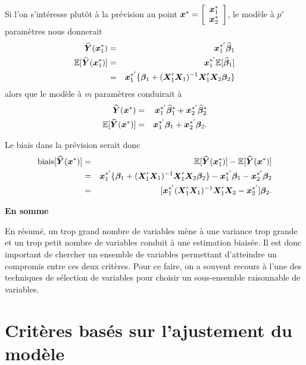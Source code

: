 Si l'on s'intéresse plutôt à la prévision au point ${\bm{x}}^* = \left[\begin{array}{cc}{\bm{x}}_1^*\\{\bm{x}}_2^*\end{array}\right]$, le modèle à $p'$ paramètres nous donnerait
\begin{eqnarray*}
   \widehat{\bm{Y}}({\bm{x}}_1^{*}) &=& {\bm{x}}_{1}^{*'} \widehat{\bm\beta}_1 \\
  \mathbb{E}[\widehat{\bm{Y}}({\bm{x}}_1^{*})] &=& {\bm{x}}_{1}^{*'} \mathbb{E}[\widehat{\bm\beta}_1]  \\
     &=& {\bm{x}}_{1}^{*'} \{\bm\beta_1 + (\bm{X}_1'\bm{X}_1)^{-1}\bm{X}_1'\bm{X}_2 \bm\beta_2\}
\end{eqnarray*}
alors que le modèle à $m$ paramètres conduirait à
\begin{eqnarray*}
   \widehat{\bm{Y}}({\bm{x}}^{*}) &=& {\bm{x}}_{1}^{*'} \widehat{\bm\beta}_1^* + {\bm{x}}_{2}^{*'}\widehat{\bm\beta}_2^* \\
  \mathbb{E}[\widehat{\bm{Y}}({\bm{x}}^{*})] &=&  {\bm{x}}_{1}^{*'} \bm\beta_1 + {\bm{x}}_{2}^{*'}\bm\beta_2.
\end{eqnarray*}

Le biais dans la prévision serait donc
\begin{eqnarray*}
   \mbox{biais}[\widehat{\bm{Y}}({\bm{x}}^{*})]&=&  \mathbb{E}[\widehat{\bm{Y}}({\bm{x}}_1^{*})] -\mathbb{E}[\widehat{\bm{Y}}({\bm{x}}^{*})]\\
   &=& {\bm{x}}_{1}^{*'} \{\bm\beta_1 + (\bm{X}_1'\bm{X}_1)^{-1}\bm{X}_1'\bm{X}_2 \bm\beta_2\} -  {\bm{x}}_{1}^{*'} \bm\beta_1 - {\bm{x}}_{2}^{*'}\bm\beta_2\\
   &=& [{{\bm{x}}_{1}^{*'}(\bm{X}_1'\bm{X}_1)^{-1}\bm{X}_1'\bm{X}_2}-{\bm{x}}_{2}^{*'}]\bm\beta_2.
\end{eqnarray*}

\textbf{En somme}

En résumé, un trop grand nombre de variables mène à une variance trop grande et un trop petit nombre de variables conduit à une estimation biaisée. Il est donc important de chercher un ensemble de variables permettant d'atteindre un compromis entre ces deux critères. Pour ce faire, on a souvent recours à l'une des techniques de sélection de variables pour choisir un sous-ensemble raisonnable de variables.

\newpage

\section{Critères basés sur l'ajustement du modèle}

